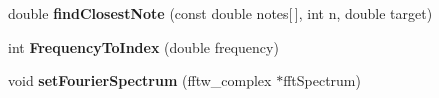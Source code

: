 \begin{DoxyCompactItemize}
\item 
\hypertarget{classVocoder_a0bc26c9977b46623e3c3fc3bc733ed24}{double {\bfseries find\-Closest\-Note} (const double notes\mbox{[}$\,$\mbox{]}, int n, double target)}\label{classVocoder_a0bc26c9977b46623e3c3fc3bc733ed24}

\item 
\hypertarget{classVocoder_aae99cff1d3e7fc029433998dc7fd0381}{int {\bfseries Frequency\-To\-Index} (double frequency)}\label{classVocoder_aae99cff1d3e7fc029433998dc7fd0381}

\item 
\hypertarget{classVocoder_a223d77b73ef3b2fa8be406e46f671441}{void {\bfseries set\-Fourier\-Spectrum} (fftw\-\_\-complex $\ast$fft\-Spectrum)}\label{classVocoder_a223d77b73ef3b2fa8be406e46f671441}

\end{DoxyCompactItemize}
